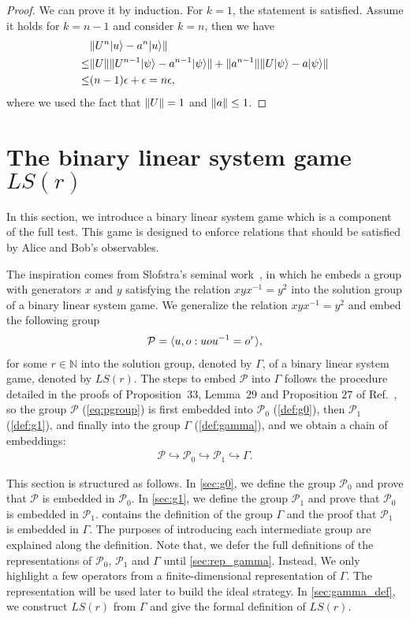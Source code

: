 \documentclass[11pt,letterpaper]{article}
\newcommand{\ket}[1]{|#1\rangle}
\DeclarePairedDelimiter{\norm}{\lVert}{\rVert}
\DeclarePairedDelimiter{\ip}{\langle}{\rangle}
\newcommand{\N}{\mathbb{N}}
\newcommand{\1}{\mathbb{1}}
\newcommand{\Pg}{\mathcal{P}}
\newcommand{\LS}{LS}
\newcommand{\ep}{\epsilon}
\theoremstyle{definition}
\begin{document}
\begin{proof}
	We can prove it by induction. 
	For $k=1$, the statement is satisfied.
	Assume it holds for $k = n-1$ and consider $k = n$, then we have
	\begin{align*}
		&\norm{U^n \ket{u} - a^n\ket{u}} \\
		\leq &\norm{U} \norm{U^{n-1} \ket{\psi} - a^{n-1}\ket{\psi}} + \norm{a^{n-1}}
		\norm{U\ket{\psi} - a \ket{\psi}}\\
		\leq &(n-1)\ep + \ep = n \ep,
	\end{align*}
	where we used the fact that $\norm{U} = 1$ and $\norm{a} \leq 1$.
\end{proof}

\section{The binary linear system game $\LS(r)$}
\label{sec:lsg}
In this section, we introduce a binary linear system game which is a component of the full test.
This game is designed to enforce relations that should be satisfied by 
Alice and Bob's observables. 

The inspiration comes from 
Slofstra's seminal work~\cite{slofstra2017}, in which he
embeds a group with generators $x$ and $y$ satisfying the relation $xyx^{-1}=y^2$
into the solution group of a binary linear system game.  
We generalize the relation $xyx^{-1} = y^2$ and embed the 
following group
\begin{align}
    \Pg = \ip{u,o:uou^{-1} = o^r},
\label{eq:pgroup}
\end{align}
for some $r \in \N$ into the solution group, denoted by $\Gamma$, of a binary linear system game, denoted by $\LS(r)$.
The steps to embed $\Pg$ into $\Gamma$ follows the procedure detailed 
in the proofs of Proposition~$33$, Lemma~$29$ and Proposition $27$ of Ref.~\cite{slofstra2017}, 
so the group $\Pg$ (\cref{eq:pgroup}) is first embedded into $\Pg_0$ (\cref{def:g0}), then $\Pg_1$ (\cref{def:g1}), and finally into the group $\Gamma$ (\cref{def:gamma}),
and we obtain a chain of embeddings:
\begin{align}
\Pg \hookrightarrow \Pg_0 \hookrightarrow \Pg_1 \hookrightarrow \Gamma.
\end{align}

This section is structured as follows.
In \cref{sec:g0}, we define the group $\Pg_0$ and prove that $\Pg$ is embedded in $\Pg_0$.
In \cref{sec:g1}, we define the group $\Pg_1$ and prove that $\Pg_0$ is embedded in $\Pg_1$.
 contains the definition of the group $\Gamma$ and the proof that $\Pg_1$
is embedded in $\Gamma$.
The purposes of introducing each intermediate
group are explained along the definition.
Note that, we defer the full definitions of the representations of $\Pg_0$, $\Pg_1$ and $\Gamma$
until \cref{sec:rep_gamma}. 
Instead, We only highlight a few operators from a finite-dimensional representation of $\Gamma$.
The representation will be used later to build the ideal strategy.
In \cref{sec:gamma_def}, we construct $\LS(r)$ from $\Gamma$ and give the 
formal definition of $\LS( r )$.
\end{document}
